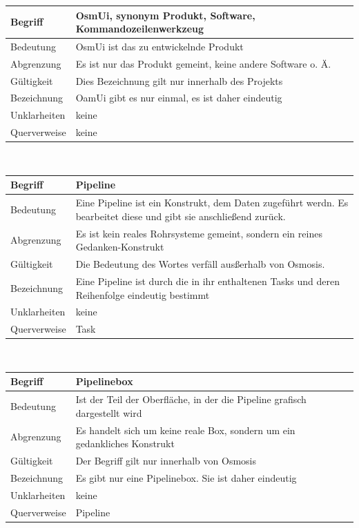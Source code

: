 \documentclass[a4paper,10pt]{scrartcl}
\begin{document}
\begin{tabular}{|p{5cm}|p{10cm}|}
\hline Begriff & \textbf{OsmUi}, synonym Produkt, Software, Kommandozeilenwerkzeug \\ 
\hline Bedeutung & OsmUi ist das zu entwickelnde Produkt \\ 
\hline Abgrenzung & Es ist nur das Produkt gemeint, keine andere Software o. Ä. \\ 
\hline Gültigkeit & Dies Bezeichnung gilt nur innerhalb des Projekts \\ 
\hline Bezeichnung & OamUi gibt es nur einmal, es ist daher eindeutig \\ 
\hline Unklarheiten & keine \\ 
\hline Querverweise & keine \\ 
\hline 
\end{tabular}
\\
\begin{tabular}{|p{5cm}|p{10cm}|}
\hline Begriff & \textbf{Pipeline} \\ 
\hline Bedeutung & Eine Pipeline ist ein Konstrukt, dem Daten zugeführt werdn. Es bearbeitet diese und gibt sie anschließend zurück.  \\ 
\hline Abgrenzung & Es ist kein reales Rohrsysteme gemeint, sondern ein reines Gedanken-Konstrukt \\ 
\hline Gültigkeit & Die Bedeutung des Wortes verfäll ausßerhalb von Osmosis. \\ 
\hline Bezeichnung & Eine Pipeline ist durch die in ihr enthaltenen Tasks und deren Reihenfolge eindeutig bestimmt \\ 
\hline Unklarheiten & keine \\ 
\hline Querverweise & Task \\ 
\hline 
\end{tabular}
\\
\begin{tabular}{|p{5cm}|p{10cm}|}
\hline Begriff & \textbf{Pipelinebox} \\ 
\hline Bedeutung & Ist der Teil der Oberfläche, in der die Pipeline grafisch dargestellt wird \\ 
\hline Abgrenzung & Es handelt sich um keine reale Box, sondern um ein gedankliches Konstrukt \\ 
\hline Gültigkeit & Der Begriff gilt nur innerhalb von Osmosis \\ 
\hline Bezeichnung & Es gibt nur eine Pipelinebox. Sie ist daher eindeutig \\ 
\hline Unklarheiten & keine \\ 
\hline Querverweise & Pipeline \\ 
\hline 
\end{tabular}
\end{document}
